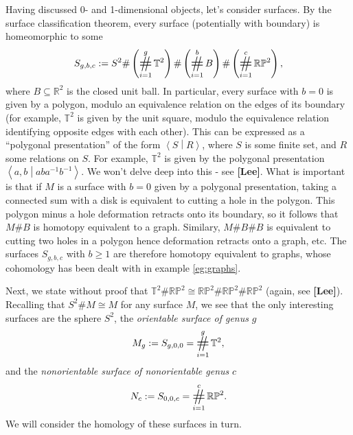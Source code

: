\documentclass{book}
\newcommand{\bbP}{\mathbb{P}}
\newcommand{\bbR}{\mathbb{R}}
\newcommand{\bbRP}{\mathbb{RP}}
\newcommand{\bbT}{\mathbb{T}}
\newcommand{\parens}[1]{\left( {#1} \right)}
\newcommand{\consum}{\mathop{\vcenter{\hbox{\LARGE\#}}}\limits}
\theoremstyle{definition}
\theoremstyle{remark}
\numberwithin{equation}{section}
\begin{document}
Having discussed 0- and 1-dimensional objects, let's consider surfaces. By the surface classification theorem, every surface (potentially with boundary) is homeomorphic to some 
\begin{equation}
    S_{g,b,c} := S^2 \# \parens{ \consum_{i=1}^g \bbT^2 } \# \parens{ \consum_{i=1}^b B } \# \parens{ \consum_{i=1}^c \bbR\bbP^2 },
\end{equation}
where $B \subseteq \bbR^2$ is the closed unit ball. In particular, every surface with $b = 0$ is given by a polygon, modulo an equivalence relation on the edges of its boundary (for example, $\bbT^2$ is given by the unit square, modulo the equivalence relation identifying opposite edges with each other). This can be expressed as a ``polygonal presentation'' of the form $\left\langle S \middle\vert R \right\rangle$, where $S$ is some finite set, and $R$ some relations on $S$. For example, $\bbT^2$ is given by the polygonal presentation $\left\langle a,b \middle\vert aba^{-1}b^{-1} \right\rangle$. We won't delve deep into this - see {\bf [Lee]}. What is important is that if $M$ is a surface with $b = 0$ given by a polygonal presentation, taking a connected sum with a disk is equivalent to cutting a hole in the polygon. This polygon minus a hole deformation retracts onto its boundary, so it follows that $M \# B$ is homotopy equivalent to a graph. Similary, $M \# B \# B$ is equivalent to cutting two holes in a polygon hence deformation retracts onto a graph, etc. The surfaces $S_{g,b,c}$ with $b \geq 1$ are therefore homotopy equivalent to graphs, whose cohomology has been dealt with in example \ref{eg:graphs}.

Next, we state without proof that $\bbT^2 \# \bbRP^2 \cong \bbRP^2 \# \bbRP^2 \# \bbRP^2$ (again, see {\bf [Lee]}). Recalling that $S^2 \# M \cong M$ for any surface $M$, we see that the only interesting surfaces are the sphere $S^2$, the \textit{orientable surface of genus} $g$ 
\begin{equation}
    M_g := S_{g,0,0} = \consum_{i=1}^g \bbT^2,
\end{equation}
and the \textit{nonorientable surface of nonorientable genus} $c$ 
\begin{equation}
    N_c := S_{0,0,c} = \consum_{i=1}^c \bbRP^2.
\end{equation}
We will consider the homology of these surfaces in turn.
\end{document}
